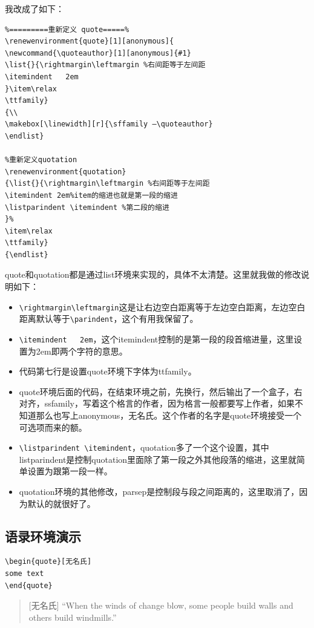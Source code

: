 \documentclass[11pt,oneside]{book}
\begin{document}
我改成了如下：
\begin{Verbatim}
%=========重新定义 quote=====%
\renewenvironment{quote}[1][anonymous]{
\newcommand{\quoteauthor}[1][anonymous]{#1}
\list{}{\rightmargin\leftmargin %右间距等于左间距
\itemindent   2em
}\item\relax
\ttfamily}
{\\
\makebox[\linewidth][r]{\sffamily —\quoteauthor}
\endlist}

%重新定义quotation
\renewenvironment{quotation}
{\list{}{\rightmargin\leftmargin %右间距等于左间距
\itemindent 2em%item的缩进也就是第一段的缩进
\listparindent \itemindent %第二段的缩进
}%
\item\relax
\ttfamily}
{\endlist}
\end{Verbatim}
quote和quotation都是通过list环境来实现的，具体不太清楚。这里就我做的修改说明如下：
\begin{itemize}
\item \verb+\rightmargin\leftmargin+这是让右边空白距离等于左边空白距离，左边空白距离默认等于\verb+\parindent+，这个有用我保留了。
\item \verb+\itemindent   2em+，这个itemindent控制的是第一段的段首缩进量，这里设置为2em即两个字符的意思。
\item 代码第七行是设置quote环境下字体为ttfamily。
\item quote环境后面的代码，在结束环境之前，先换行，然后输出了一个盒子，右对齐，ssfamily，写着这个格言的作者，因为格言一般都要写上作者，如果不知道那么也写上anonymous，无名氏。这个作者的名字是quote环境接受一个可选项而来的额。
\item \verb+\listparindent \itemindent+，quotation多了一个这个设置，其中listparindent是控制quotation里面除了第一段之外其他段落的缩进，这里就简单设置为跟第一段一样。
\item quotation环境的其他修改，parsep是控制段与段之间距离的，这里取消了，因为默认的就很好了。
\end{itemize}

\subsection{语录环境演示}
\begin{Verbatim}
\begin{quote}[无名氏]
some text
\end{quote}
\end{Verbatim}


\begin{quote}[无名氏]
“When the winds of change blow, some people build walls and others build windmills.”
\end{quote}
\end{document}
